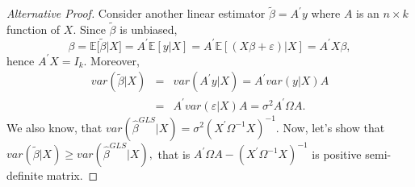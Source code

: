 \documentclass[notes=show]{beamer}
\begin{document}
%

\begin{frame}%

\begin{proof}[Alternative Proof]
Consider another linear estimator $\widetilde{\beta }=A^{\prime }y$ where $A$
is an $n\times k$ function of $X.$ Since $\widetilde{\beta }$ is unbiased, 
\begin{equation*}
\beta =\mathbb{E[}\widetilde{\beta }|X]=A^{\prime }\mathbb{E}\left[ y|X%
\right] =A^{\prime }\mathbb{E}\left[ \left( X\beta +\varepsilon \right) |X%
\right] =A^{\prime }X\beta ,
\end{equation*}%
hence $A^{\prime }X=I_{k}.$ Moreover, 
\begin{eqnarray*}
var\left( \widetilde{\beta }|X\right)  &=&var\left( A^{\prime }y|X\right)
=A^{\prime }var\left( y|X\right) A \\
&=&A^{\prime }var\left( \varepsilon |X\right) A=\sigma ^{2}A^{\prime }\Omega
A.
\end{eqnarray*}%
We also know, that $var\left( \hat{\beta}^{GLS}|X\right) =\sigma
^{2}(X^{\prime }\Omega ^{-1}X)^{-1}.$ Now, let's show that $var\left( 
\widetilde{\beta }|X\right) \geq var\left( \hat{\beta}^{GLS}|X\right) ,$
that is $A^{\prime }\Omega A-(X^{\prime }\Omega ^{-1}X)^{-1}$ is positive
semi-definite matrix.
\end{proof}

\end{frame}%
\end{document}
